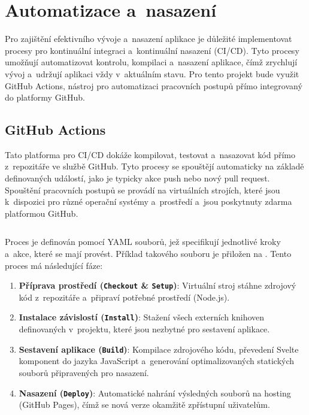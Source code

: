 \section{Automatizace a~nasazení}
\label{sec:ci_cd}

Pro zajištění efektivního vývoje a~nasazení aplikace je důležité implementovat procesy pro kontinuální integraci a~kontinuální nasazení (CI/CD).
Tyto procesy umožňují automatizovat kontrolu, kompilaci a~nasazení aplikace, čímž zrychlují vývoj a~udržují aplikaci vždy v~aktuálním stavu.
Pro tento projekt bude využit \mbox{GitHub} Actions, nástroj pro automatizaci pracovních postupů přímo integrovaný do platformy \mbox{GitHub}.

\subsection{GitHub Actions}
\label{subsec:github_actions}

Tato platforma pro CI/CD dokáže kompilovat, testovat a~nasazovat kód přímo z~repozitáře ve službě \mbox{GitHub}.
Tyto procesy se spouštějí automaticky na základě definovaných událostí, jako je typicky akce push nebo nový pull request.
Spouštění pracovních postupů se provádí na virtuálních strojích, které jsou k~dispozici pro různé operační systémy a~prostředí a~jsou poskytnuty zdarma platformou \mbox{GitHub}.~\cite{actions}

\begin{listing}[ht]
    \inputminted{yaml}{code/technologies/gh_actions.yml}
    \caption{Příklad konfigurace GitHub Actions pro CI/CD}
    \label{code:example_yaml}
\end{listing}

Proces je definován pomocí YAML souborů, jež specifikují jednotlivé kroky a~akce, které se mají provést.
Příklad takového souboru je přiložen na .
Tento proces má následující fáze:

\begin{enumerate}
    \item \textbf{Příprava prostředí (\texttt{Checkout} \& \texttt{Setup})}: Virtuální stroj stáhne zdrojový kód z~repozitáře a~připraví potřebné prostředí (Node.js).
    \item \textbf{Instalace závislostí (\texttt{Install})}: Stažení všech externích knihoven definovaných v~projektu, které jsou nezbytné pro sestavení aplikace.
    \item \textbf{Sestavení aplikace (\texttt{Build})}: Kompilace zdrojového kódu, převedení Svelte komponent do jazyka JavaScript a~generování optimalizovaných statických souborů připravených pro nasazení.
    \item \textbf{Nasazení (\texttt{Deploy})}: Automatické nahrání výsledných souborů na hosting (\mbox{GitHub} Pages), čímž se nová verze okamžitě zpřístupní uživatelům.
\end{enumerate}

